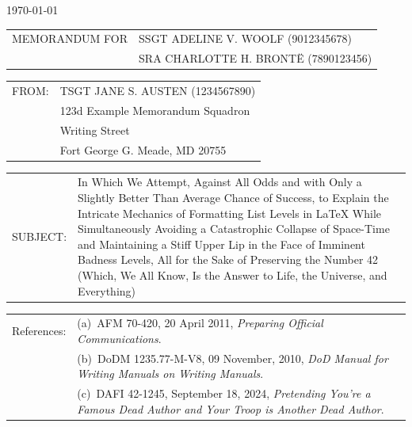 \documentclass[12pt]{article}
\newlength{\baseSpaceLength}
\newcommand{\spaceLength}[1]{\dimexpr #1\baseSpaceLength\relax} %
\newcommand{\setcolumnwidth}[2]{
    \newlength{#1}%
    \settowidth{#1}{#2}%
    \addtolength{#1}{\spaceLength{2}} %
}
\begin{document}
\pagestyle{default}
\thispagestyle{firstpage}
\begin{RaggedRight}

\noindent\hfill\DTG\today

\setcolumnwidth{\memoWidth}{MEMORANDUM FOR}
\noindent
\begin{tabularx}{\textwidth}{@{} p{\memoWidth} @{} >{\RaggedRight}X @{}}
MEMORANDUM FOR & SSGT ADELINE V. WOOLF (9012345678)\\
               & SRA CHARLOTTE H. BRONTË (7890123456)\\
\end{tabularx}

\setcolumnwidth{\fromWidth}{FROM:}
\noindent
\begin{tabularx}{\textwidth}{@{} p{\fromWidth} @{} >{\RaggedRight}X @{}}
FROM: & TSGT JANE S. AUSTEN (1234567890)\\
      & 123d Example Memorandum Squadron\\
      & 4567 Writing Street\\
      & Fort George G. Meade, MD 20755\\
\end{tabularx}

\setcolumnwidth{\subjectWidth}{SUBJECT:}
\noindent
\begin{tabularx}{\textwidth}{@{} p{\subjectWidth} @{} >{\RaggedRight}X @{}}
SUBJECT: & In Which We Attempt, Against All Odds and with Only a Slightly Better Than Average Chance of Success, to Explain the Intricate Mechanics of Formatting List Levels in LaTeX While Simultaneously Avoiding a Catastrophic Collapse of Space-Time and Maintaining a Stiff Upper Lip in the Face of Imminent Badness Levels, All for the Sake of Preserving the Number 42 (Which, We All Know, Is the Answer to Life, the Universe, and Everything)\\
\end{tabularx}

\setcolumnwidth{\referencesWidth}{References:}
\noindent
\begin{tabularx}{\textwidth}{@{} p{} @{} >{\RaggedRight}X @{}}
References: & (a)~AFM 70-420, 20 April 2011, \textit{Preparing Official Communications}.\\
            & (b)~DoDM 1235.77-M-V8, 09 November, 2010, \textit{DoD Manual for Writing Manuals on Writing Manuals}.\\
            & (c)~DAFI 42-1245, September 18, 2024, \textit{Pretending You're a Famous Dead Author and Your Troop is Another Dead Author}.\\
\end{tabularx}


\end{RaggedRight}
\end{document}
